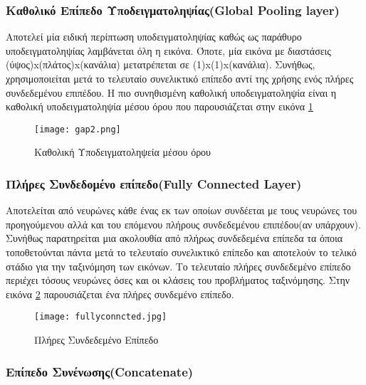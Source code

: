 \subsubsection{Καθολικό Επίπεδο Υποδειγματοληψίας(Global Pooling layer)}
\label{subsubsec:3.1.3.3}
Αποτελεί μία ειδική περίπτωση υποδειγματοληψίας καθώς ως παράθυρο υποδειγματοληψίας λαμβάνεται όλη η εικόνα. Όποτε, μία εικόνα με διαστάσεις (ύψος)x(πλάτος)x(κανάλια) μετατρέπεται σε (1)x(1)x(κανάλια). Συνήθως, χρησιμοποιείται μετά το τελευταίο συνελικτικό επίπεδο αντί της χρήσης ενός πλήρες συνδεδεμένου επιπέδου. Η πιο συνηθισμένη καθολική υποδειγματοληψία είναι η καθολική υποδειγματοληψία μέσου όρου που παρουσιάζεται στην εικόνα \ref{figure:gap2}



\begin{figure}[!h]
    \centering
      \texttt{[image: gap2.png]} \caption{Καθολική Υποδειγματοληψεία μέσου όρου}
      \label{figure:gap2}    
  \end{figure}


\subsubsection{Πλήρες Συνδεδομένο επίπεδο(Fully Connected Layer)}
\label{subsubsec:3.1.3.4}


Αποτελείται από  νευρώνες κάθε ένας εκ των οποίων συνδέεται με τους νευρώνες του προηγούμενου αλλά και του επόμενου πλήρους συνδεδεμένου επιπέδου(αν υπάρχουν). Συνήθως παρατηρείται μια ακολουθία από πλήρως συνδεδεμένα επίπεδα τα όποια τοποθετούνται πάντα μετά το τελευταίο συνελικτικό επίπεδο και αποτελούν το τελικό στάδιο για την ταξινόμηση των εικόνων. Το τελευταίο πλήρες συνδεδεμένο επίπεδο περιέχει τόσους νευρώνες όσες και οι κλάσεις του προβλήματος ταξινόμησης. Στην εικόνα \ref{figure:fullyconncted} παρουσιάζεται ένα πλήρες συνδεμένο επίπεδο.


\begin{figure}[!h]
    \centering
      \texttt{[image: fullyconncted.jpg]} \caption{Πλήρες Συνδεδεμένο Επίπεδο}
\label{figure:fullyconncted}  
\end{figure}



\subsubsection{Επίπεδο Συνένωσης(Concatenate)}
\label{subsubsec:3.1.3.5}



